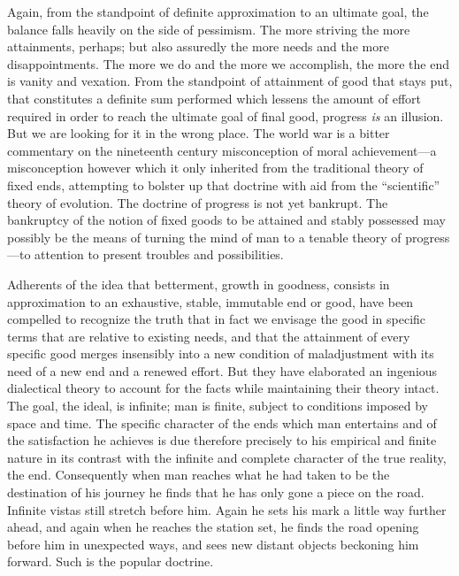 \documentclass[12pt]{article}
\begin{document}
Again, from the standpoint of definite approximation
to an ultimate goal, the balance falls heavily on the side
of pessimism. The more striving the more attainments,
perhaps; but also assuredly the more needs and the
more disappointments. The more we do and the more
we accomplish, the more the end is vanity and vexation.
From the standpoint of attainment of good that
stays put, that constitutes a definite sum performed
which lessens the amount of effort required in order to
reach the ultimate goal of final good, progress \emph{is} an
illusion. But we are looking for it in the wrong place.
The world war is a bitter commentary on the nineteenth
century misconception of moral achievement---a misconception
however which it only inherited from the
traditional theory of fixed ends, attempting to bolster
up that doctrine with aid from the ``scientific'' theory
of evolution. The doctrine of progress is not yet bankrupt.
The bankruptcy of the notion of fixed goods to
be attained and stably possessed may possibly be the
means of turning the mind of man to a tenable theory
of progress---to attention to present troubles and possibilities.

Adherents of the idea that betterment, growth in
goodness, consists in approximation to an exhaustive,
stable, immutable end or good, have been compelled to
recognize the truth that in fact we envisage the good
in specific terms that are relative to existing needs, and
that the attainment of every specific good merges insensibly
into a new condition of maladjustment with its
need of a new end and a renewed effort. But they
have elaborated an ingenious dialectical theory to account
for the facts while maintaining their theory intact.
The goal, the ideal, is infinite; man is finite, subject
to conditions imposed by space and time. The
specific character of the ends which man entertains
and of the satisfaction he achieves is due therefore
precisely to his empirical and finite nature in its contrast
with the infinite and complete character of the
true reality, the end. Consequently when man reaches
what he had taken to be the destination of his journey
he finds that he has only gone a piece on the road. Infinite
vistas still stretch before him. Again he sets his
mark a little way further ahead, and again when he
reaches the station set, he finds the road opening before
him in unexpected ways, and sees new distant objects
beckoning him forward. Such is the popular doctrine.
\end{document}
